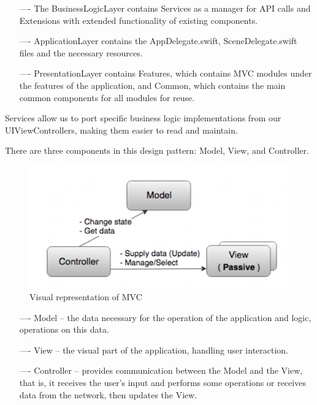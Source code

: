 \begin{itemize}
    \item[----] The BusinessLogicLayer contains Services as a manager for API calls and Extensions with extended functionality of existing components. 
    \item[----] ApplicationLayer contains the AppDelegate.swift, SceneDelegate.swift files and the necessary resources.
    \item[----] PresentationLayer contains Features, which contains MVC modules under the features of the application, and Common, which contains the main common components for all modules for reuse.
\end{itemize}

Services allow us to port specific business logic implementations from our UIViewControllers, making them easier to read and maintain.

There are three components in this design pattern: Model, View, and Controller.

\begin{figure}[h]
    \centering
    \includegraphics[scale=0.4]{figures/iOS/ios2.png}
    \caption{Visual representation of MVC}
    \label{fig:VisualrepresentationofMVC}
\end{figure}

\begin{itemize}
    \item[----] Model -- the data necessary for the operation of the application and logic, operations on this data.
    \item[----] View -- the visual part of the application, handling user interaction.
    \item[----] Controller -- provides communication between the Model and the View, that is, it receives the user's input and performs some operations or receives data from the network, then updates the View.
\end{itemize}

